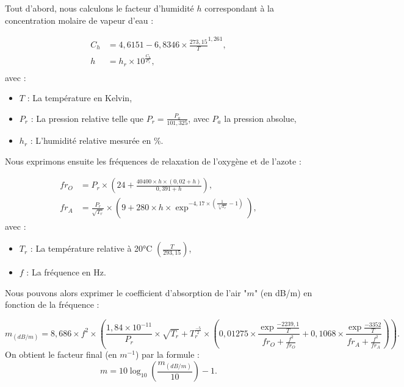 Tout d'abord, nous calculons le facteur d'humidité $h$ correspondant à la concentration molaire de vapeur d'eau \cite[Annexe B, B.1]{iso} :

\begin{align*}
	C_h & = 4,6151 - 6,8346 \times \frac{273,15}{T}^{1,261},  \\
	h & = h_r \times 10^{\frac{C_h}{P_r}}, \\ 
\end{align*}
avec :
\begin{itemize}
\item $T$ : La température en Kelvin,
\item $P_r$ : La pression relative telle que $P_r = \frac{P_a}{101,325}$, avec $P_a$ la pression absolue,
\item $h_r$ : L'humidité relative mesurée en \%.
\end{itemize}
Nous exprimons ensuite les fréquences de relaxation de l'oxygène et de l'azote \cite[6.2, eq. 3 et 4]{iso}:

\begin{align*}
	fr_O & =  P_r \times \left(24 + \frac{40400 \times h \times (0,02 + h)}{0,391 + h}\right),  \\
	fr_A & =  \frac{P_r}{\sqrt{T_r}} \times \left(9 + 280 \times h \times \exp^{-4,17 \times (\frac{1}{\sqrt[3]{T_r}} - 1)}\right),
\end{align*}
avec :
\begin{itemize}
\item $T_r$ : La température relative à 20°C $\left(\frac{T}{293,15}\right)$,
\item $f$ : La fréquence en Hz.
\end{itemize}

Nous pouvons alors exprimer le coefficient d'absorption de l'air "$m$" (en dB/m) en fonction de la fréquence  \cite[6.2, eq. 5]{iso} :

\begin{equation*}
	m_{(dB/m)} = 8,686 \times f^2 \times \left(\frac{1,84 \times 10^{-11}}{P_r} \times \sqrt{T_r} + T_r^{\frac{-5}{2}} \times \left(0,01275 \times \frac{\exp{\frac{-2239,1}{T}}}{fr_O + \frac{f^2}{fr_O}} + 0,1068 \times  \frac{\exp{\frac{-3352}{T}}}{fr_A + \frac{f^2}{fr_A}}\right)\right).
\end{equation*}
On obtient le facteur final (en $m^{-1}$) par la formule :
\begin{equation}
	m = 10\log_{10}{\left(\frac{m_{(dB/m)}}{10}\right)} - 1.
\end{equation}

